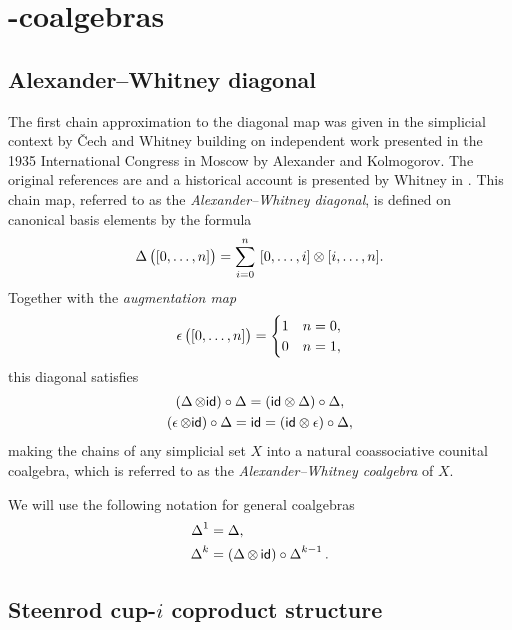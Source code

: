 
\section{\pdfEinfty-coalgebras} \label{s:integrally}


\subsection{Alexander--Whitney diagonal} \label{ss:aw diagonal}

The first chain approximation to the diagonal map was given in the simplicial context by \v{C}ech and Whitney building on independent work presented in the 1935 International Congress in Moscow by Alexander and Kolmogorov.
The original references are \cite{alexander1936ring, cech1936multiplication, whitney1938products} and a historical account is presented by Whitney in \cite[p.110]{whitney1988history}.
This chain map, referred to as the \textit{Alexander--Whitney diagonal}, is defined on canonical basis elements by the formula
\begin{equation} \label{e:alexander-whitney coalgebra}
\operatorname{\Delta} \big( [0,\dots,n] \big) = \sum_{i=0}^n \ [0, \dots, i] \otimes [i, \dots, n].
\end{equation}
Together with the \textit{augmentation map}
\begin{equation} \label{e:augmentation map}
\operatorname{\epsilon} \big( [0,\dots,n] \big) =
\begin{cases}
1 & n=0, \\ 0 & n=1,
\end{cases}
\end{equation}
this diagonal satisfies
\begin{gather}
\label{e:coassociativity relation}
(\operatorname{\Delta} \otimes \mathsf{id}) \circ \operatorname{\Delta} = (\mathsf{id} \otimes \operatorname{\Delta}) \circ \operatorname{\Delta}, \\
\label{e:counital relation}
(\operatorname{\epsilon} \otimes \mathsf{id}) \circ \operatorname{\Delta} = \mathsf{id} = (\mathsf{id} \otimes \operatorname{\epsilon}) \circ \operatorname{\Delta},
\end{gather}
making the chains of any simplicial set $X$ into a natural coassociative counital coalgebra, which is referred to as the \textit{Alexander--Whitney coalgebra} of $X$.

We will use the following notation for general coalgebras
\begin{align*}
\operatorname{\Delta}^1 &= \operatorname{\Delta}, \\
\operatorname{\Delta}^k &= (\operatorname{\Delta} \otimes \, \mathsf{id}) \circ \operatorname{\Delta}^{k-1}.
\end{align*}

\subsection{Steenrod cup-$i$ coproduct structure} \label{ss:cup-i}

